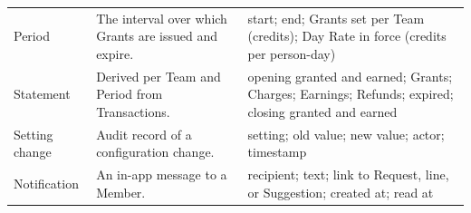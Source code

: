{\begin{longtable}{@{}L{2.9cm}L{7.2cm}L{5.4cm}@{}}
Period & The interval over which Grants are issued and expire. & start; end; Grants set per Team (credits); Day Rate in force (credits per person-day) \\
Statement & Derived per Team and Period from Transactions. & opening granted and earned; Grants; Charges; Earnings; Refunds; expired; closing granted and earned \\
Setting change & Audit record of a configuration change. & setting; old value; new value; actor; timestamp \\
Notification & An in-app message to a Member. & recipient; text; link to Request, line, or Suggestion; created at; read at \\
\end{longtable}
}
